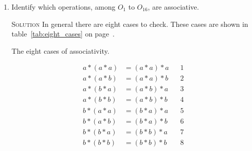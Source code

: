 \documentclass[twoside]{amsart}
\newcommand{\Solution}{\textsc{Solution}\xspace}
\begin{document}
\begin{enumerate}[label=\textbf{\arabic*}, leftmargin=1em]
   \item Identify which operations, among $O_1$ to $O_{16}$, are 
   associative.

   \noindent \Solution 
   In general there are eight cases to check. These cases are shown in
   table~\ref{tab:eight_cases} on page~\pageref{tab:eight_cases}.
%
   \begin{table}
   \caption{The eight cases of associativity.}
   \label{tab:eight_cases}
   \begin{align*}
      a * (a * a) & = (a * a) * a && 1\\
      a * (a * b) & = (a * a) * b && 2\\
      a * (b * a) & = (a * b) * a && 3\\
      a * (b * b) & = (a * b) * b && 4\\
      b * (a * a) & = (b * a) * a && 5\\
      b * (a * b) & = (b * a) * b && 6\\
      b * (b * a) & = (b * b) * a && 7\\
      b * (b * b) & = (b * b) * b && 8
   \end{align*}
   \end{table}


\end{enumerate}
\end{document}
